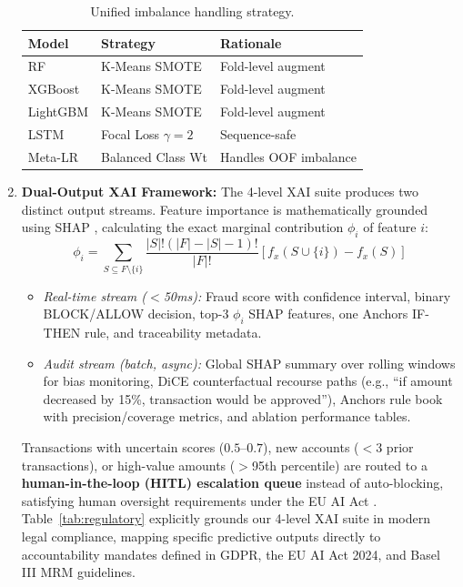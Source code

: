 \documentclass[10pt,a4paper,twocolumn]{article}
\begin{document}
\begin{enumerate}
    \begin{table}[H]
    \centering
    \caption{Unified imbalance handling strategy.}
    \label{tab:imbalance}
    {\footnotesize
    \begin{tabularx}{\linewidth}{@{}lXl@{}}
    \toprule
    \textbf{Model} & \textbf{Strategy} & \textbf{Rationale} \\
    \midrule
    RF       & K-Means SMOTE               & Fold-level augment \\
    XGBoost  & K-Means SMOTE               & Fold-level augment \\
    LightGBM & K-Means SMOTE               & Fold-level augment \\
    LSTM     & Focal Loss $\gamma{=}2$       & Sequence-safe \\
    Meta-LR  & Balanced Class Wt      & Handles OOF imbalance \\
    \bottomrule
    \end{tabularx}
    }
    \end{table}
    \item \textbf{Dual-Output XAI Framework:} The 4-level XAI suite produces two distinct output streams. Feature importance is mathematically grounded using SHAP \cite{lundberg2017}, calculating the exact marginal contribution $\phi_i$ of feature $i$:
    \begin{equation}
    \phi_i = \sum_{S \subseteq F \setminus \{i\}} \frac{|S|! (|F| - |S| - 1)!}{|F|!} [f_x(S \cup \{i\}) - f_x(S)]
    \end{equation}
    \begin{itemize}
        \item \textit{Real-time stream ($<$50ms):} Fraud score with confidence interval, binary BLOCK/ALLOW decision, top-3 $\phi_i$ SHAP features, one Anchors IF-THEN rule, and traceability metadata.
        \item \textit{Audit stream (batch, async):} Global SHAP summary over rolling windows for bias monitoring, DiCE counterfactual recourse paths (e.g., ``if amount decreased by 15\%, transaction would be approved''), Anchors rule book with precision/coverage metrics, and ablation performance tables.
    \end{itemize}
    Transactions with uncertain scores ($0.5$--$0.7$), new accounts ($<$3 prior transactions), or high-value amounts ($>$95th percentile) are routed to a \textbf{human-in-the-loop (HITL) escalation queue} instead of auto-blocking, satisfying human oversight requirements under the EU AI Act \cite{euaiact2024}. Table~\ref{tab:regulatory} explicitly grounds our 4-level XAI suite in modern legal compliance, mapping specific predictive outputs directly to accountability mandates defined in GDPR, the EU AI Act 2024, and Basel III MRM guidelines.


\end{enumerate}
\end{document}
